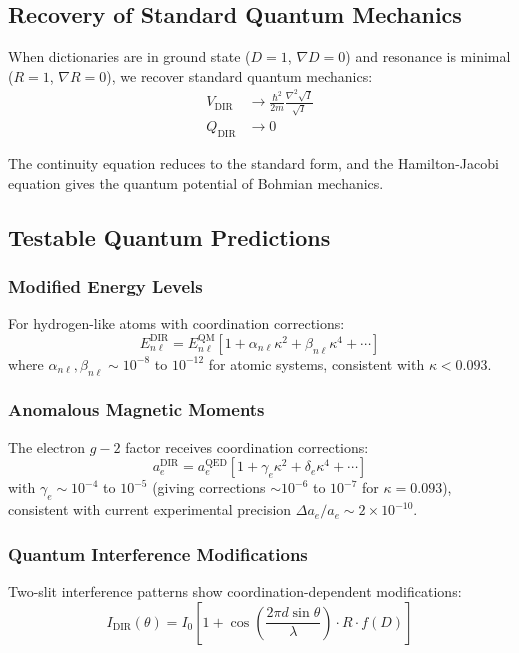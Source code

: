 \documentclass[11pt,a4paper]{article}
\begin{document}
	\subsection{Recovery of Standard Quantum Mechanics}
	
	When dictionaries are in ground state ($D = 1$, $\nabla D = 0$) and resonance is minimal ($R = 1$, $\nabla R = 0$), we recover standard quantum mechanics:
	\begin{align}
		V_{\text{DIR}} &\to \frac{\hbar^2}{2m} \frac{\nabla^2 \sqrt{I}}{\sqrt{I}} \\
		Q_{\text{DIR}} &\to 0
	\end{align}
	
	The continuity equation reduces to the standard form, and the Hamilton-Jacobi equation gives the quantum potential of Bohmian mechanics.
	
	\subsection{Testable Quantum Predictions}
	
	\subsubsection{Modified Energy Levels}
	For hydrogen-like atoms with coordination corrections:
	\begin{equation}
		E_{n\ell}^{\text{DIR}} = E_{n\ell}^{\text{QM}} \left[ 1 + \alpha_{n\ell} \kappa^2 + \beta_{n\ell} \kappa^4 + \cdots \right]
	\end{equation}
	where $\alpha_{n\ell}, \beta_{n\ell} \sim 10^{-8}$ to $10^{-12}$ for atomic systems, consistent with $\kappa < 0.093$.
	
	\subsubsection{Anomalous Magnetic Moments}
	The electron $g-2$ factor receives coordination corrections:
	\begin{equation}
		a_e^{\text{DIR}} = a_e^{\text{QED}} \left[ 1 + \gamma_e \kappa^2 + \delta_e \kappa^4 + \cdots \right]
	\end{equation}
	with $\gamma_e \sim 10^{-4}$ to $10^{-5}$ (giving corrections $\sim 10^{-6}$ to $10^{-7}$ for $\kappa=0.093$),
	consistent with current experimental precision $\Delta a_e/a_e \sim 2\times10^{-10}$.
	
	\subsubsection{Quantum Interference Modifications}
	Two-slit interference patterns show coordination-dependent modifications:
	\begin{equation}
		I_{\text{DIR}}(\theta) = I_0 \left[ 1 + \cos\left( \frac{2\pi d \sin\theta}{\lambda} \right) \cdot R \cdot f(D) \right]
	\end{equation}
	
\end{document}
